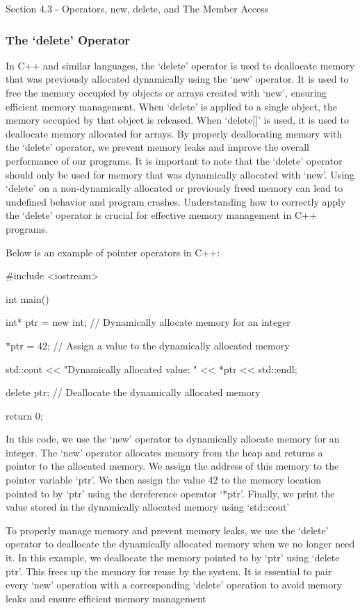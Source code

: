 \begin{notes}{Section 4.3 - Operators, new, delete, and The Member Access}
    \subsubsection*{The `delete' Operator}
    
    In C++ and similar languages, the `delete' operator is used to deallocate memory that was previously allocated dynamically using the `new' operator. It is used to free the memory occupied by objects or arrays created with `new', ensuring 
    efficient memory management. When `delete' is applied to a single object, the memory occupied by that object is released. When `delete[]' is used, it is used to deallocate memory allocated for arrays. By properly deallocating memory with 
    the `delete' operator, we prevent memory leaks and improve the overall performance of our programs. It is important to note that the `delete' operator should only be used for memory that was dynamically allocated with `new'. Using `delete' 
    on a non-dynamically allocated or previously freed memory can lead to undefined behavior and program crashes. Understanding how to correctly apply the `delete' operator is crucial for effective memory management in C++ programs.
    
    \begin{highlight}
        Below is an example of pointer operators in C++:
        
    \begin{code}[C++]   
    #include <iostream>
    
    int main() {
        int* ptr = new int;  // Dynamically allocate memory for an integer
    
        *ptr = 42;  // Assign a value to the dynamically allocated memory
    
        std::cout << "Dynamically allocated value: " << *ptr << std::endl;
    
        delete ptr;  // Deallocate the dynamically allocated memory
    
        return 0;
    }
    \end{code}
        In this code, we use the `new' operator to dynamically allocate memory for an integer. The `new' operator allocates memory from the heap and returns a pointer to the allocated memory. We assign the address of this memory to the 
        pointer variable `ptr'. We then assign the value 42 to the memory location pointed to by `ptr' using the dereference operator `*ptr'. Finally, we print the value stored in the dynamically allocated memory using `std::cout'
        
        To properly manage memory and prevent memory leaks, we use the `delete' operator to deallocate the dynamically allocated memory when we no longer need it. In this example, we deallocate the memory pointed to by `ptr' using `delete ptr'. 
        This frees up the memory for reuse by the system. It is essential to pair every `new' operation with a corresponding `delete' operation to avoid memory leaks and ensure efficient memory management
    \end{highlight}
\end{notes}

